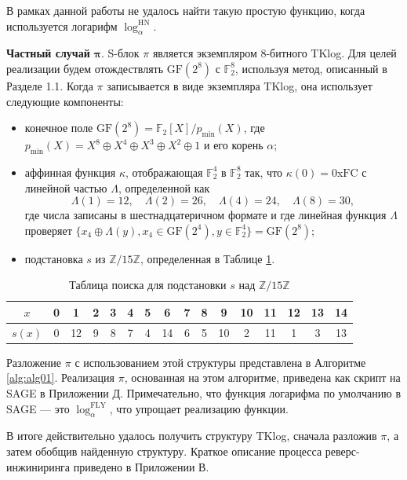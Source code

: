 В рамках данной работы не удалось найти такую простую функцию, когда используется логарифм \(\log_{\alpha}^{\text{HN}}\).

\textbf{Частный случай} $\bm{\pi}$. S-блок \(\pi\) является экземпляром 8-битного TKlog. Для целей реализации будем отождествлять \(\text{GF}(2^8)\) с \(\mathbb{F}^8_2\), используя метод, описанный в Разделе 1.1. Когда \(\pi\) записывается в виде экземпляра TKlog, она использует следующие компоненты:

\begin{itemize}
    \item конечное поле \(\text{GF}(2^8) = \mathbb{F}_2[X]/p_{\text{min}}(X)\), где \(p_{\text{min}}(X) = X^8 \oplus X^4 \oplus X^3 \oplus X^2 \oplus 1\) и его корень \(\alpha\);
    \item аффинная функция \(\kappa\), отображающая \(\mathbb{F}^4_2\) в \(\mathbb{F}^8_2\) так, что \(\kappa(0) = 0\)x\(\text{FC}\) с линейной частью \(\Lambda\), определенной как
    \[
    \Lambda(1) = 12, \quad \Lambda(2) = 26, \quad \Lambda(4) = 24, \quad \Lambda(8) = 30,
    \] где числа записаны в шестнадцатеричном формате и где линейная функция \(\Lambda\) проверяет \(\{x_4 \oplus \Lambda(y), x_4 \in \text{GF}(2^4), y \in \mathbb{F}^4_2\} = \text{GF}(2^8)\);
    \item подстановка \(s\) из \(\mathbb{Z}/15\mathbb{Z}\), определенная в Таблице \ref{tab:tab1}.
\end{itemize}

\begin{table}    
  \caption{Таблица поиска для подстановки \(s\) над \(\mathbb{Z}/15\mathbb{Z}\)}
  \begin{tabular}{cccccccccccccccc}
    \hline$x$ & 0 & 1 & 2 & 3 & 4 & 5 & 6 & 7 & 8 & 9 & 10 & 11 & 12 & 13 & 14 \\
    \hline$s(x)$ & 0 & 12 & 9 & 8 & 7 & 4 & 14 & 6 & 5 & 10 & 2 & 11 & 1 & 3 & 13 \\
    \hline
  \end{tabular}
  \label{tab:tab1}
\end{table}

Разложение \(\pi\) с использованием этой структуры представлена в Алгоритме \ref{alg:alg01}. Реализация \(\pi\), основанная на этом алгоритме, приведена как скрипт на SAGE \cite{Dev17} в Приложении Д. Примечательно, что функция логарифма по умолчанию в SAGE — это \(\log_{\alpha}^{\text{FLY}}\), что упрощает реализацию функции.

В итоге действительно удалось получить структуру TKlog, сначала разложив \(\pi\), а затем обобщив найденную структуру. Краткое описание процесса реверс-инжиниринга приведено в Приложении В.

